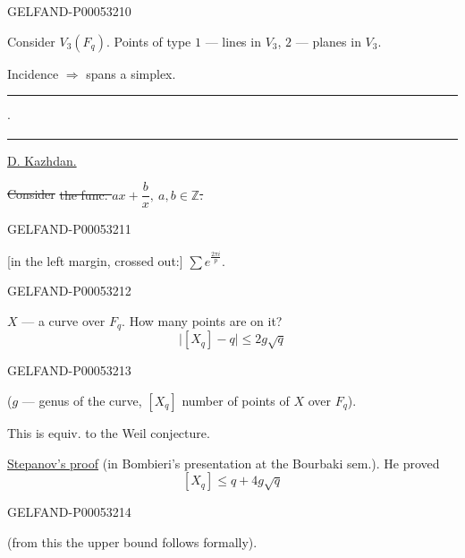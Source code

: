 \begin{GelfandAdjacentEvidence}{GELFAND-P000532}{10}


Consider \uline{\mbox{$V_3(F_q)$}}.
Points of type $1$ — lines in $V_3$, $2$ — planes in $V_3$.

Incidence $\Rightarrow$ spans a simplex.

\hfill\rule{1.2cm}{.35pt}\enspace\(\cdot\)\enspace\rule{1.5cm}{.35pt}\par

\uline{D. Kazhdan.}

\sout{Consider}\quad
\sout{the func. \mbox{$ax+\dfrac b x,\ a,b\in\mathbb Z$}.}
\end{GelfandAdjacentEvidence}
\begin{GelfandAdjacentEvidence}{GELFAND-P000532}{11}


[in the left margin, crossed out:] \sout{\mbox{$\displaystyle\sum e^{\frac{2\pi i}{p}}$}}.
\end{GelfandAdjacentEvidence}
\begin{GelfandAdjacentEvidence}{GELFAND-P000532}{12}


$X$ — a curve over $F_q$. How many points are on it?
\[
\bigl|[X_q]-q\bigr|\le 2g\sqrt q
\]
\end{GelfandAdjacentEvidence}
\begin{GelfandAdjacentEvidence}{GELFAND-P000532}{13}

($g$ — genus of the curve, $[X_q]$ number of points of $X$ over $F_q$).

This is equiv. to the Weil conjecture.

\uline{Stepanov’s proof} (in Bombieri’s presentation at the Bourbaki sem.). He proved
\[
[X_q]\le q+4g\sqrt q
\]
\end{GelfandAdjacentEvidence}
\begin{GelfandAdjacentEvidence}{GELFAND-P000532}{14}

(from this the upper bound follows formally).
\end{GelfandAdjacentEvidence}
